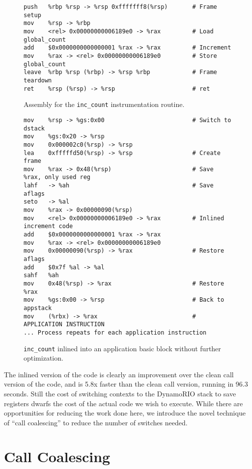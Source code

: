 \begin{figure}
\begin{verbatim}
push   %rbp %rsp -> %rsp 0xfffffff8(%rsp)       # Frame setup
mov    %rsp -> %rbp 
mov    <rel> 0x00000000006189e0 -> %rax         # Load global_count
add    $0x0000000000000001 %rax -> %rax         # Increment
mov    %rax -> <rel> 0x00000000006189e0         # Store global_count
leave  %rbp %rsp (%rbp) -> %rsp %rbp            # Frame teardown
ret    %rsp (%rsp) -> %rsp                      # ret
\end{verbatim}
\caption{Assembly for the {\tt inc\_count} instrumentation routine.}
\label{fig:inc_count_asm}
\end{figure}

\begin{figure}
\begin{verbatim}
mov    %rsp -> %gs:0x00                         # Switch to dstack
mov    %gs:0x20 -> %rsp 
mov    0x000002c0(%rsp) -> %rsp 
lea    0xfffffd50(%rsp) -> %rsp                 # Create frame
mov    %rax -> 0x48(%rsp)                       # Save %rax, only used reg
lahf   -> %ah                                   # Save aflags
seto   -> %al 
mov    %rax -> 0x00000090(%rsp) 
mov    <rel> 0x00000000006189e0 -> %rax         # Inlined increment code
add    $0x0000000000000001 %rax -> %rax 
mov    %rax -> <rel> 0x00000000006189e0 
mov    0x00000090(%rsp) -> %rax                 # Restore aflags
add    $0x7f %al -> %al 
sahf   %ah 
mov    0x48(%rsp) -> %rax                       # Restore %rax
mov    %gs:0x00 -> %rsp                         # Back to appstack
mov    (%rbx) -> %rax                           # APPLICATION INSTRUCTION
... Process repeats for each application instruction
\end{verbatim}
\caption{{\tt inc\_count} inlined into an application basic block without
further optimization.}
\label{fig:inscount_inlined}
\end{figure}

The inlined version of the code is clearly an improvement over the clean call
version of the code, and is 5.8x faster than the clean call version, running in
96.3 seconds.  Still the cost of switching contexts to the DynamoRIO stack to
save registers dwarfs the cost of the actual code we wish to execute.  While
there are opportunities for reducing the work done here, we introduce the novel
technique of ``call coalescing'' to reduce the number of switches needed.

\section{Call Coalescing}

